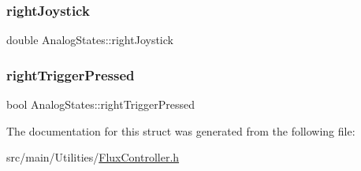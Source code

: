 \mbox{\label{structAnalogStates_afa6408973c530772131737107f0c36f5}} 
\subsubsection{\texorpdfstring{right\+Joystick}{rightJoystick}}
{\footnotesize\ttfamily double Analog\+States\+::right\+Joystick}

\mbox{\label{structAnalogStates_aabedabe1fbaca0dc05b233afe51f1ac7}} 
\subsubsection{\texorpdfstring{right\+Trigger\+Pressed}{rightTriggerPressed}}
{\footnotesize\ttfamily bool Analog\+States\+::right\+Trigger\+Pressed}



The documentation for this struct was generated from the following file\+:\begin{DoxyCompactItemize}
\item 
src/main/\+Utilities/\hyperlink{FluxController_8h}{Flux\+Controller.\+h}\end{DoxyCompactItemize}
